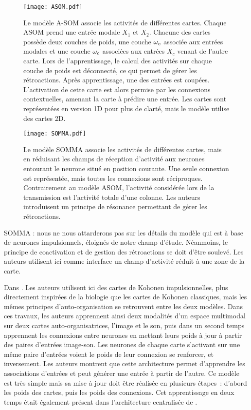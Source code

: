 \documentclass[../main]{subfiles}
\begin{document}
\begin{figure}
    \centering\texttt{[image: ASOM.pdf]}
    \caption{Le modèle A-SOM \cite{johnsson_associative_2009} associe les activités de différentes cartes. Chaque ASOM prend une entrée modale $X_1$ et $X_2$. Chacune des cartes possède deux couches de poids, une couche $\omega_e$ associée aux entrées modales et une couche $\omega_c$ associées aux entrées $X_c$ venant de l'autre carte. Lors de l'apprentissage, le calcul des activités sur chaque couche de poids est déconnecté, ce qui permet de gérer les rétroactions. 
    Après apprentissage, une des entrées est coupées. L'activation de cette carte est alors permise par les connexions contextuelles, amenant la carte à prédire une entrée. Les cartes sont représentées en version 1D pour plus de clarté, mais le modèle utilise des cartes 2D.
    \label{fig:asom}}
\end{figure}


\begin{figure}
    \centering\texttt{[image: SOMMA.pdf]}
    \caption{Le modèle SOMMA \cite{lefort_unlearning_2011,lefort_apprentissage_2012} associe les activités de différentes cartes, mais en réduisant les champs de réception d'activité aux neurones entourant le neurone situé en position courante. Une seule connexion est représentée, mais toutes les connexions sont réciproques. Contrairement au modèle ASOM, l'activité considérée lors de la transmission est l'activité totale d'une colonne. Les auteurs introduisent un principe de résonance permettant de gérer les rétroactions.
    \label{fig:asom}}
\end{figure}

SOMMA : nous ne nous attarderons pas sur les détails du modèle qui est à base de neurones impulsionnels, éloignés de notre champ d'étude. Néanmoins, le principe de coactivation et de gestion des rétroactions se doit d'être soulevé. Les auteurs utilisent ici comme interface un champ d'activité réduit à une zone de la carte.

Dans \cite{khacef_brain-inspired_2020}. Les auteurs utilisent ici des cartes de Kohonen impulsionnelles, plus directement inspirées de la biologie que les cartes de Kohonen classiques, mais les mêmes principes d'auto-organisation se retrouvent entre les deux modèles. Dans ces travaux, les auteurs apprennent ainsi deux modalités d'un espace multimodal sur deux cartes auto-organisatrices, l'image et le son, puis dans un second temps apprennent les connexions entre neurones en mettant leurs poids à jour à partir des paires d'entrées image-son. Les neurones de chaque carte s'activant sur une même paire d'entrées voient le poids de leur connexion se renforcer, et inversement.
Les auteurs montrent que cette architecture permet d'apprendre les associations d'entrées et peut générer une entrée à partir de l'autre. 
Ce modèle est très simple mais sa mise à jour doit être réalisée en plusieurs étapes~: d'abord les poids des cartes, puis les poids des connexions. 
Cet apprentissage en deux temps était également présent dans l'architecture centralisée de \cite{dominey13}.
\end{document}

